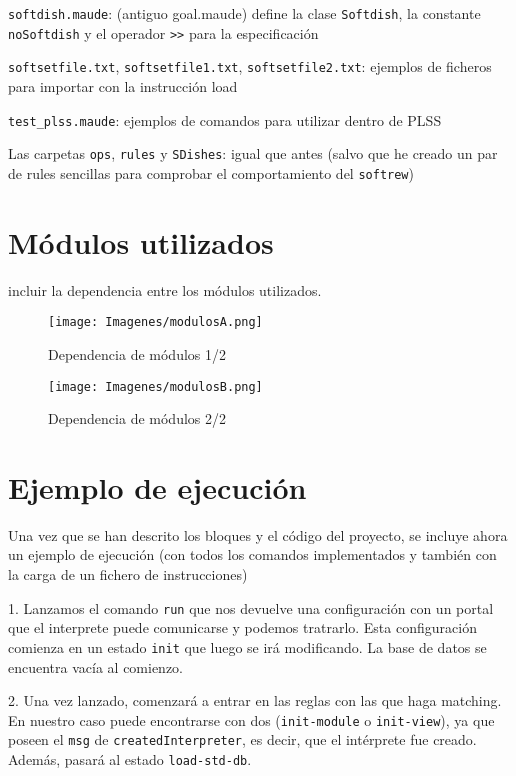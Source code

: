 \texttt{softdish.maude}: (antiguo goal.maude) define la clase \texttt{Softdish}, la constante \texttt{noSoftdish} y el operador \verb$>>$ para la especificación

\texttt{softsetfile.txt}, \texttt{softsetfile1.txt}, \texttt{softsetfile2.txt}: ejemplos de ficheros para importar con la instrucción load

\texttt{test\_plss.maude}: ejemplos de comandos para utilizar dentro de PLSS

Las carpetas \texttt{ops}, \texttt{rules} y \texttt{SDishes}: igual que antes (salvo que he creado un par de rules sencillas para comprobar el comportamiento del \texttt{softrew})



\section{Módulos utilizados}
incluir la dependencia entre los módulos utilizados.
\medskip

\begin{figure}[h]
	\centering
	\texttt{[image: Imagenes/modulosA.png]}
	\caption{Dependencia de módulos 1/2}
	\label{fig:modulos}
\end{figure}

\begin{figure}[h]
	\centering
	\texttt{[image: Imagenes/modulosB.png]}
	\caption{Dependencia de módulos 2/2}
	\label{fig:modulos2}
\end{figure}


\section{Ejemplo de ejecución}
Una vez que se han descrito los bloques y el código del proyecto, se incluye ahora un ejemplo de ejecución (con todos los comandos implementados y también con la carga de un fichero de instrucciones)
\medskip

1. Lanzamos el comando \texttt{run} que nos devuelve una configuración con un portal que el interprete puede comunicarse y podemos tratrarlo. Esta configuración comienza en un estado \texttt{init} que luego se irá modificando.
La base de datos se encuentra vacía al comienzo.

2. Una vez lanzado, comenzará a entrar en las reglas con las que haga matching. En nuestro caso puede encontrarse con dos (\texttt{init-module} o \texttt{init-view}), ya que poseen el \texttt{msg} de \texttt{createdInterpreter}, es decir, que el intérprete fue creado. Además, pasará al estado \texttt{load-std-db}.  


